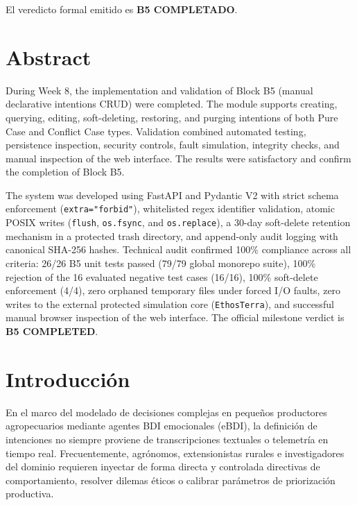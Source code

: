 \documentclass[11pt,a4paper]{article}
\begin{document}
El veredicto formal emitido es \textbf{B5 COMPLETADO}.

\section{Abstract}

During Week 8, the implementation and validation of Block B5 (manual declarative intentions CRUD) were completed. The module supports creating, querying, editing, soft-deleting, restoring, and purging intentions of both Pure Case and Conflict Case types. Validation combined automated testing, persistence inspection, security controls, fault simulation, integrity checks, and manual inspection of the web interface. The results were satisfactory and confirm the completion of Block B5.

The system was developed using FastAPI and Pydantic V2 with strict schema enforcement (\texttt{extra="forbid"}), whitelisted regex identifier validation, atomic POSIX writes (\texttt{flush}, \texttt{os.fsync}, and \texttt{os.replace}), a 30-day soft-delete retention mechanism in a protected trash directory, and append-only audit logging with canonical SHA-256 hashes. Technical audit confirmed 100\% compliance across all criteria: 26/26 B5 unit tests passed (79/79 global monorepo suite), 100\% rejection of the 16 evaluated negative test cases (16/16), 100\% soft-delete enforcement (4/4), zero orphaned temporary files under forced I/O faults, zero writes to the external protected simulation core (\texttt{EthosTerra}), and successful manual browser inspection of the web interface. The official milestone verdict is \textbf{B5 COMPLETED}.

\section{Introducción}

En el marco del modelado de decisiones complejas en pequeños productores agropecuarios mediante agentes BDI emocionales (eBDI), la definición de intenciones no siempre proviene de transcripciones textuales o telemetría en tiempo real. Frecuentemente, agrónomos, extensionistas rurales e investigadores del dominio requieren inyectar de forma directa y controlada directivas de comportamiento, resolver dilemas éticos o calibrar parámetros de priorización productiva.
\end{document}
